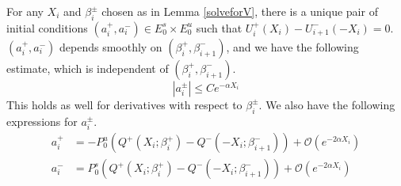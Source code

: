 \documentclass[thesis.tex]{subfiles}
\begin{document}
\begin{lemma}\label{solvefora}
For any $X_i$ and $\beta_i^\pm$ chosen as in Lemma \ref{solveforV}, there is a unique pair of initial conditions $(a_i^+, a_i^-) \in E_0^s \times E_0^u$ such that $U_i^+(X_i) - U_{i+1}^-(-X_i) = 0$. $(a_i^+, a_i^-)$ depends smoothly on $(\beta_i^+, \beta_{i+1}^-)$, and we have the following estimate, which is independent of $(\beta_i^+, \beta_{i+1}^-)$.
\begin{equation}\label{aest}
|a_i^\pm| \leq C e^{-\alpha X_i}
\end{equation}
This holds as well for derivatives with respect to $\beta_i^\pm$. We also have the following expressions for $a_i^\pm$.
\begin{equation}\label{aiformula}
\begin{aligned}
a_i^+ &= -P^u_0 \left( Q^+(X_i; \beta_i^+) - Q^-(-X_i; \beta_{i+1}^-) \right) + \mathcal{O}( e^{-2 \alpha X_i} ) \\
a_i^- &= P^s_0 \left( Q^+(X_i; \beta_i^+) - Q^-(-X_i; \beta_{i+1}^-) \right) + \mathcal{O}\left( e^{-2 \alpha X_i} \right)
\end{aligned}
\end{equation}


\end{lemma}
\end{document}

